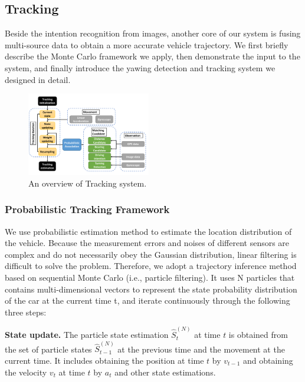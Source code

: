 \documentclass[journal]{IEEEtran}
\begin{document}
\subsection{Tracking}\label{sec:tracking}
Beside the intention recognition from images, another core of our system is fusing multi-source data\cite{hostettler2014vehicle} to obtain a more accurate vehicle trajectory. We first briefly describe the Monte Carlo framework we apply, then demonstrate the input to the system, and finally introduce the yawing detection and tracking system we designed in detail.

\begin{figure}[htbp]
    \centerline{\includegraphics[width=0.48\textwidth]{fig/PF-Systemoverall.pdf}}
    \caption{An overview of Tracking system.}
    \label{fig:track_system}
\end{figure}

\subsubsection{Probabilistic Tracking Framework}
 We use probabilistic estimation method to estimate the location distribution of the vehicle. Because the measurement errors and noises of different sensors are complex and do not necessarily obey the Gaussian distribution, linear filtering is difficult to solve the problem. Therefore, we adopt a trajectory inference method based on sequential Monte Carlo (i.e., particle filtering). It uses N particles that contains multi-dimensional vectors to represent the state probability distribution of the car at the current time t, and iterate continuously through the following three steps\cite{du2019enhanced}:

\textbf{State update.} 
The particle state estimation $\hat{S}_{t}^{(N)}$ at time $t$ is obtained from the set of particle states $\hat{S}_{t-1}^{(N)}$ at the previous time and the movement at the current time. It includes obtaining the position at time $t$ by $v_{t-1}$ and obtaining the velocity $v_{t}$ at time $t$ by $a_{t}$ and other state estimations.
\end{document}
